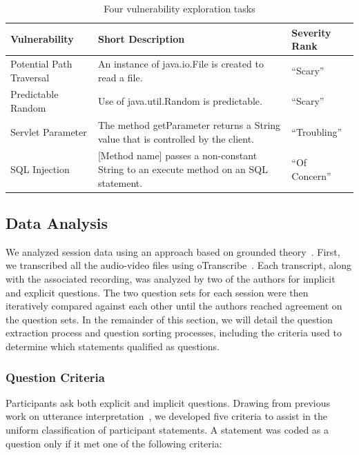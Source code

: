 \documentclass{acm_proc_article-sp}
\begin{document}
\begin{table} 
\centering
\caption{Four vulnerability exploration tasks}
\begin{tabularx}{\textwidth}{|l|X|l|}
\rowcolor{gray!50}
\hline
    Vulnerability				& Short Description													& Severity Rank 	\\
    \hline	
    Potential Path Traversal	& An instance of java.io.File is created to read a file.     			& ``Scary''	    \\
    \hline
    Predictable Random			& Use of java.util.Random is predictable. 								& ``Scary''		\\
    \hline
    Servlet Parameter 			& The method getParameter returns a String value that is controlled by the client.			& ``Troubling''	\\
    \hline
    SQL Injection				& [Method name] passes a non-constant String to an execute method on an SQL statement.     	& ``Of Concern'' \\
    \hline
\end{tabularx}
\label{table:vulnerabilities}
\end{table}


\subsection{Data Analysis}
\label{dataAnalysis}
We analyzed session data using an approach based on grounded theory~\cite{glaser2009discovery}. 
First, we transcribed all the audio-video files using oTranscribe~\cite{OTranscribe}.
Each transcript, along with the associated recording, was analyzed by two of the authors for implicit and explicit questions. 
The two question sets for each session were then iteratively compared against each other until the authors reached agreement on the question sets. 
In the remainder of this section, we will detail the question extraction process and question sorting processes, including the criteria used to determine which statements qualified as questions.
\subsubsection{Question Criteria}
Participants ask both explicit and implicit questions. 
Drawing from previous work on utterance interpretation~\cite{letovsky1987cognitive}, we developed five criteria to assist in the uniform classification of participant statements. 
A statement was coded as a question only if it met one of the following criteria:
\end{document}
